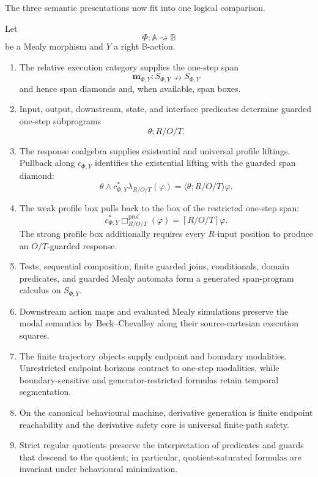 The three semantic presentations now fit into one logical comparison.

\begin{theorem}
\label{thm:dynamic-response-trajectory-main-summary}
Let
\[
    \Phi:\mathbb A\rightsquigarrow\mathbb B
\]
be a Mealy morphism and \(Y\) a right \(\mathbb B\)-action.

\begin{enumerate}
\item The relative execution category supplies the one-step span
\[
    \mathbf m_{\Phi,Y}:
    S_{\Phi,Y}\nrightarrow S_{\Phi,Y}
\]
and hence span diamonds and, when available, span boxes.

\item Input, output, downstream, state, and interface predicates determine
guarded one-step subprograms
\[
    \theta;R/O/T.
\]

\item The response coalgebra supplies existential and universal profile
liftings.  Pullback along \(c_{\Phi,Y}\) identifies the existential lifting
with the guarded span diamond:
\[
    \theta\wedge
    c_{\Phi,Y}^\ast\lambda_{R/O/T}(\varphi)
    =
    \langle\theta;R/O/T\rangle\varphi.
\]

\item The weak profile box pulls back to the box of the restricted one-step
span:
\[
    c_{\Phi,Y}^\ast
    \Box^{\mathrm{prof}}_{R/O/T}(\varphi)
    =
    [R/O/T]\varphi.
\]
The strong profile box additionally requires every \(R\)-input position to
produce an \(O/T\)-guarded response.

\item Tests, sequential composition, finite guarded joins, conditionals,
domain predicates, and guarded Mealy automata form a generated span-program
calculus on \(S_{\Phi,Y}\).

\item Downstream action maps and evaluated Mealy simulations preserve the
modal semantics by Beck--Chevalley along their source-cartesian execution
squares.

\item The finite trajectory objects supply endpoint and boundary modalities.
Unrestricted endpoint horizons contract to one-step modalities, while
boundary-sensitive and generator-restricted formulas retain temporal
segmentation.

\item On the canonical behavioural machine, derivative generation is finite
endpoint reachability and the derivative safety core is universal
finite-path safety.

\item Strict regular quotients preserve the interpretation of predicates and
guards that descend to the quotient; in particular, quotient-saturated
formulas are invariant under behavioural minimization.
\end{enumerate}
\end{theorem}

